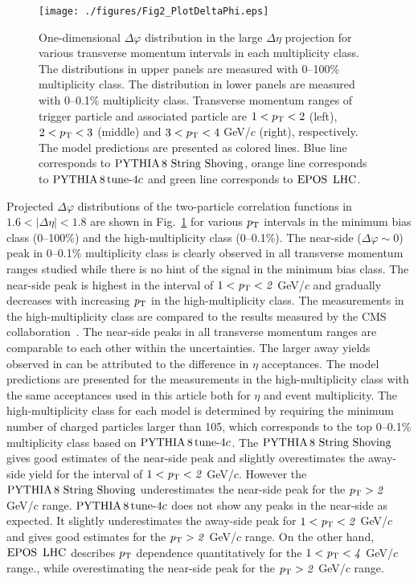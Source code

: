 \begin{figure}[h!]
	\centering
	\texttt{[image: ./figures/Fig2\_PlotDeltaPhi.eps]}
	\caption{One-dimensional $\Delta\varphi$ distribution in the large $\Delta\eta$ projection for various transverse momentum intervals in each multiplicity class. The distributions in upper panels are measured with 0--100\% multiplicity class. The distribution in lower panels are measured with 0--0.1\% multiplicity class. Transverse momentum ranges of trigger particle and associated particle are $1<p_\mathrm{T}<2$ (left), $2<p_\mathrm{T}<3$ (middle) and $3<p_\mathrm{T}<4$ GeV/$c$ (right), respectively. The model predictions are presented as colored lines. Blue line corresponds to ${\mathrm{PYTHIA}\,8~\mathrm{String}~}\mathrm{Shoving}$, orange line corresponds to $\mathrm{PYTHIA}\,8\,\mathrm{tune}{\text -}4c$ and green line corresponds to ${\mathrm{EPOS}\,~\mathrm{LHC}}$.}
	\label{fig:PlotDeltaPhi}
\end{figure}
 
Projected $\Delta\varphi$ distributions of the two-particle correlation functions in $1.6<|\Delta\eta|<1.8$ are shown in Fig.~\ref{fig:PlotDeltaPhi} for various $\it{p}_{\rm{T}}$ intervals in the minimum bias class (0--100\%) and the high-multiplicity class (0--0.1\%). The near-side ($\Delta\varphi\sim 0$) peak in 0--0.1\% multiplicity class is clearly observed in all transverse momentum ranges studied while there is no hint of the signal in the minimum bias class. The near-side peak is highest in the interval of $1<\it{p}_{\rm{T}}<2$ GeV/$c$ and gradually decreases with increasing $\it{p}_{\rm{T}}$ in the high-multiplicity class. The measurements in the high-multiplicity class are compared to the results measured by the CMS collaboration~\cite{Khachatryan:2015lva}. The near-side peaks in all transverse momentum ranges are comparable to each other within the uncertainties. The larger away yields observed in \cite{Khachatryan:2015lva} can be attributed to the difference in $\eta$ acceptances. The model predictions are presented for the measurements in the high-multiplicity class with the same acceptances used in this article both for $\eta$ and event multiplicity. The high-multiplicity class for each model is determined by requiring the minimum number of charged particles larger than 105, which corresponds to the top 0--0.1\% multiplicity class based on $\mathrm{PYTHIA}\,8\,\mathrm{tune}{\text -}4c$. The ${\mathrm{PYTHIA}\,8~\mathrm{String}~}\mathrm{Shoving}$ gives good estimates of the near-side peak and slightly overestimates the away-side yield for the interval of $1<\it{p}_{\rm{T}}<2$ GeV/$c$. However the ${\mathrm{PYTHIA}\,8~\mathrm{String}~}\mathrm{Shoving}$ underestimates the near-side peak for the $\it{p}_{\rm{T}}>2$ GeV/$c$ range. $\mathrm{PYTHIA}\,8\,\mathrm{tune}{\text -}4c$ does not show any peaks in the near-side as expected. It slightly underestimates the away-side peak for $1<\it{p}_{\rm{T}}<2$ GeV/$c$ and gives good estimates for the $\it{p}_{\rm{T}}>2$ GeV/$c$ range. On the other hand, ${\mathrm{EPOS}\,~\mathrm{LHC}}$ describes $p_\mathrm{T}$ dependence quantitatively for the $1<\it{p}_{\rm{T}}<4$ GeV/$c$ range., while overestimating the near-side peak for the $\it{p}_{\rm{T}}>2$ GeV/$c$ range. 



